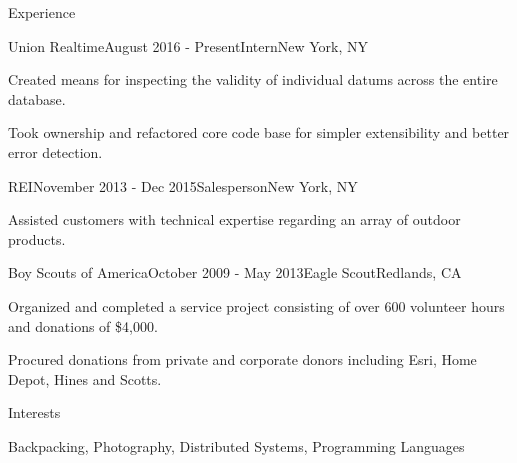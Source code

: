 \documentclass{resume} %
\begin{document}
\begin{rSection}{Experience}

\begin{rSubsection}{Union Realtime}{August 2016 - Present}{Intern}{New York, NY}
\item Created means for inspecting the validity of individual datums across the entire database.
\item Took ownership and refactored core code base for simpler extensibility and better error detection.
\end{rSubsection}


\begin{rSubsection}{REI}{November 2013 - Dec 2015}{Salesperson}{New York, NY}
\item Assisted customers with technical expertise regarding an array of outdoor products.
\end{rSubsection}


\begin{rSubsection}{Boy Scouts of America}{October 2009 - May 2013}{Eagle Scout}{Redlands, CA}
\item Organized and completed a service project consisting of over 600 volunteer hours and donations of \$4,000.
\item Procured donations from private and corporate  donors including Esri, Home Depot, Hines and Scotts.
\end{rSubsection}

\end{rSection}


\begin{rSection}{Interests}

Backpacking, Photography, Distributed Systems, Programming Languages

\end{rSection}





\end{document}
